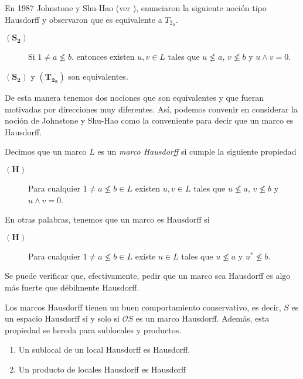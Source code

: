 \documentclass{comunicaciones}
\begin{document}
En 1987 Johnstone y Shu-Hao (ver \cite{J.S.}), enunciaron la siguiente noción tipo Hausdorff y observaron que es equivalente a $T_{2_S}$.

\begin{description}
    \item[$\mathbf{(S_2)}$] Si $1\neq a\nleq b$. entonces existen $u, v\in L$ tales que $u\nleq a$, $v\nleq b$ y $u\wedge v=0$. 
\end{description}

\begin{prop}\label{Proposicion3.3.1}
    $\mathbf{(S_2)}$ y $\mathbf{(T_{2_S})}$ son equivalentes.
\end{prop}

De esta manera tenemos dos nociones que son equivalentes y que fueran motivadas por direcciones muy diferentes. Así, podemos convenir en considerar la noción de Johnstone y Shu-Hao como la conveniente para decir que un marco es Hausdorff.

\begin{dfn}\label{MarcoHausdorff}
    Decimos que un marco $L$ es un \emph{marco Hausdorff} si cumple la siguiente propiedad
    \begin{description}
        \item[$\mathbf{(H)}$] Para cualquier $1\neq a\nleq b\in L$ existen $u, v\in L$ tales que $u\nleq a$, $v\nleq b$ y $u\wedge v=0$. 
    \end{description}
\end{dfn}
En otras palabras, tenemos que un marco es Hausdorff si
\begin{description}
    \item[$\mathbf{(H)}$]  Para cualquier $1\neq a\nleq b\in L$ existe $u\in L$ tales que $u\nleq a$ y $u^*\nleq b$. 
\end{description}

Se puede verificar que, efectivamente, pedir que un marco sea Hausdorff es algo más fuerte que débilmente Hausdorff.\\

\begin{obs}\label{Observacion3.4.1}
Los marcos Hausdorff tienen un buen comportamiento conservativo, es decir, $S$ es un espacio Hausdorff si y solo si $\mathcal{O}S$ es un marco Hausdorff. Además, esta propiedad se hereda para sublocales y productos.
\end{obs}

\begin{prop}\label{Heredar H}
    \begin{enumerate}
        \item Un sublocal de un local Hausdorff es Hausdorff.
        \item Un producto de locales Hausdorff es Hausdorff
    \end{enumerate}
\end{prop}
\end{document}
